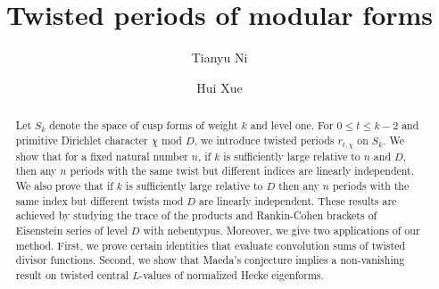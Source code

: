 \documentclass[11pt,letterpaper,reqno]{amsart}
\title{Twisted periods of modular forms}
\newcommand\ques[1]{\textcolor{blue}{\textbf{Question}: #1}}
\newcommand\answ[1]{\textcolor{magenta}{\textbf{Answer}: #1}}
\numberwithin{figure}{section}
\numberwithin{table}{section}
\theoremstyle{definition}
\theoremstyle{plain}
\theoremstyle{definition}
\theoremstyle{definition}
\theoremstyle{remark}
\numberwithin{equation}{section}
\theoremstyle{remark}
\begin{document}
\author{Tianyu Ni}
\address{School of Mathematical and Statistical Sciences\\
Clemson University\\
Clemson, SC 29634-0975\\
USA}
\author{Hui Xue}
\address{School of Mathematical and Statistical Sciences\\
Clemson University\\
Clemson, SC 29634-0975\\
USA}
\begin{abstract}
    Let $S_k$ denote the space of cusp forms of weight $k$ and level one. For $0\leq t\leq k-2$ and primitive Dirichlet character $\chi$ mod $D$, we introduce twisted periods $r_{t,\chi}$ on $S_k$. We show that for a fixed natural number $n$, if $k$ is sufficiently large relative to $n$ and $D$, then any $n$ periods with the same twist but different indices are linearly independent. We also prove that if $k$ is sufficiently large relative to $D$ %
    then any $n$ periods with the same index but different twists mod $D$ are linearly independent. These results are achieved by studying the trace of the products and Rankin-Cohen brackets of Eisenstein series of level $D$ with nebentypus. 
    Moreover, we give two applications of our method. First, we prove certain identities that evaluate convolution sums of twisted divisor functions. Second, we show that Maeda's conjecture implies a non-vanishing result on twisted central $L$-values of normalized Hecke eigenforms. 
\end{abstract}
\maketitle
\end{document}
